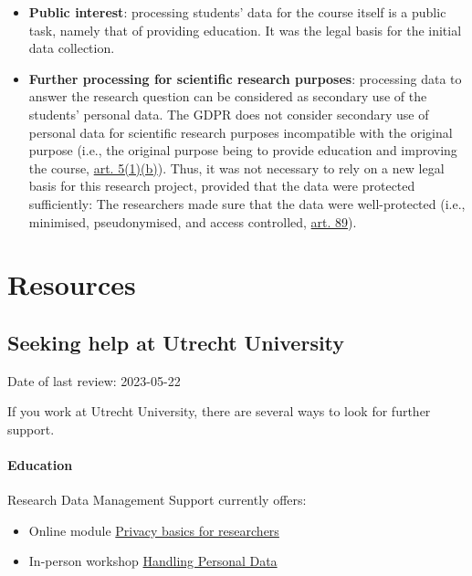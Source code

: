 \documentclass[
]{book}
\providecommand{\tightlist}{%
  \setlength{\itemsep}{0pt}\setlength{\parskip}{0pt}}
\begin{document}
\begin{itemize}
  \begin{itemize}
  \tightlist
  \item
    \textbf{Public interest}: processing students' data for the course itself is a
    public task, namely that of providing education. It was the legal basis for
    the initial data collection.
  \item
    \textbf{Further processing for scientific research purposes}: processing data to
    answer the research question can be considered as secondary use of the
    students' personal data. The GDPR does not consider secondary use of personal
    data for scientific research purposes incompatible with the original purpose
    (i.e., the original purpose being to provide education and improving the
    course, \href{https://gdpr-info.eu/art-5-gdpr/}{art. 5(1)(b)}).
    Thus, it was not necessary to rely on a new legal basis for this research
    project, provided that the data were protected sufficiently: The researchers
    made sure that the data were well-protected (i.e., minimised, pseudonymised,
    and access controlled, \href{https://gdpr-info.eu/art-89-gdpr/}{art. 89}).
  \end{itemize}
\end{itemize}

\hypertarget{part-resources}{%
\part*{Resources}\label{part-resources}}

\hypertarget{seeking-help}{%
\chapter{Seeking help at Utrecht University}\label{seeking-help}}

Date of last review: 2023-05-22

If you work at Utrecht University, there are several ways to look for further
support.

\hypertarget{education}{%
\subsection{Education}\label{education}}

Research Data Management Support currently offers:

\begin{itemize}
\tightlist
\item
  Online module \href{https://www.uu.nl/en/research/research-data-management/walk-in-hours-workshops/privacy-basics-online-training}{Privacy basics for researchers}
\item
  In-person workshop \href{https://www.uu.nl/en/research/research-data-management/training-workshops/handling-personal-data-in-research}{Handling Personal Data}
\end{itemize}
\end{document}

